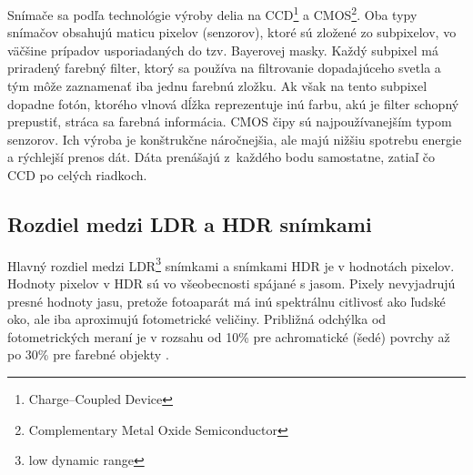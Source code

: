 \begin{description}
    Snímače sa podľa technológie výroby delia na CCD\footnote{Charge–Coupled Device} a CMOS\footnote{Complementary Metal Oxide Semiconductor}.
    Oba typy snímačov obsahujú maticu pixelov (senzorov), ktoré sú zložené zo subpixelov, vo väčšine prípadov usporiadaných do tzv.
    Bayerovej masky. Každý subpixel má priradený farebný filter, ktorý sa používa na filtrovanie dopadajúceho svetla a tým môže zaznamenať
    iba jednu farebnú zložku. Ak však na tento subpixel dopadne fotón, ktorého vlnová dĺžka reprezentuje inú farbu, akú je filter
    schopný prepustiť, stráca sa farebná informácia. CMOS čipy sú najpoužívanejším typom senzorov. Ich výroba je konštrukčne náročnejšia,
    ale majú nižšiu spotrebu energie a rýchlejší prenos dát. Dáta prenášajú z~každého bodu samostatne, zatiaľ čo CCD po celých riadkoch.
\end{description}

\subsection*{Rozdiel medzi LDR a HDR snímkami}

Hlavný rozdiel medzi LDR\footnote{low dynamic range} snímkami a snímkami HDR je v hodnotách pixelov.
Hodnoty pixelov v HDR sú vo všeobecnosti spájané s jasom. Pixely nevyjadrujú presné hodnoty
jasu, pretože fotoaparát má inú spektrálnu citlivosť ako ľudské oko, ale iba aproximujú 
fotometrické veličiny. Približná odchýlka od fotometrických meraní je v rozsahu od 10\% 
pre achromatické (šedé) povrchy až po 30\% pre farebné objekty \cite{DCmerania}.
